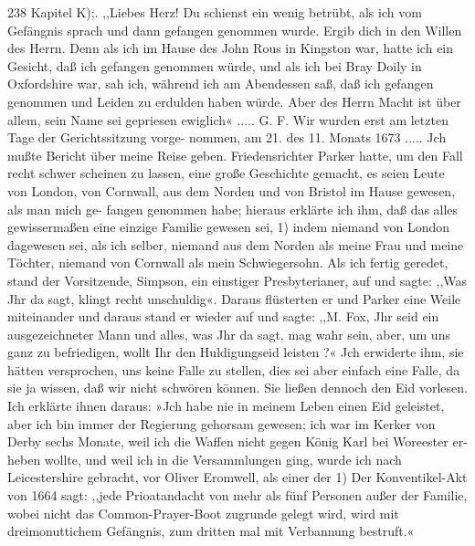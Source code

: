 238 Kapitel K);.
,,Liebes Herz!
Du schienst ein wenig betrübt, als ich vom Gefängnis sprach
und dann gefangen genommen wurde. Ergib dich in den Willen
des Herrn. Denn als ich im Hause des John Rous in Kingston
war, hatte ich ein Gesicht, daß ich gefangen genommen würde,
und als ich bei Bray Doily in Oxfordshire war, sah ich, während
ich am Abendessen saß, daß ich gefangen genommen und Leiden
zu erdulden haben würde. Aber des Herrn Macht ist über allem, sein
Name sei gepriesen ewiglich« ..... G. F.
Wir wurden erst am letzten Tage der Gerichtssitzung vorge-
nommen, am 21. des 11. Monats 1673 ..... Jch mußte
Bericht über meine Reise geben. Friedensrichter Parker hatte,
um den Fall recht schwer scheinen zu lassen, eine große Geschichte
gemacht, es seien Leute von London, von Cornwall, aus dem
Norden und von Bristol im Hause gewesen, als man mich ge-
fangen genommen habe; hieraus erklärte ich ihm, daß das alles
gewissermaßen eine einzige Familie gewesen sei, 1) indem niemand von
London dagewesen sei, als ich selber, niemand aus dem Norden als
meine Frau und meine Töchter, niemand von Cornwall als mein
Schwiegersohn.
Als ich fertig geredet, stand der Vorsitzende, Simpson, ein
einstiger Presbyterianer, auf und sagte: ,,Was Jhr da sagt, klingt
recht unschuldig«. Daraus flüsterten er und Parker eine Weile
miteinander und daraus stand er wieder auf und sagte: ,,M. Fox,
Jhr seid ein ausgezeichneter Mann und alles, was Jhr da sagt,
mag wahr sein, aber, um uns ganz zu befriedigen, wollt Ihr den
Huldigungseid leisten ?« Jch erwiderte ihm, sie hätten versprochen,
uns keine Falle zu stellen, dies sei aber einfach eine Falle, da sie
ja wissen, daß wir nicht schwören können. Sie ließen dennoch
den Eid vorlesen. Ich erklärte ihnen daraus: »Jch habe nie in
meinem Leben einen Eid geleistet, aber ich bin immer der Regierung
gehorsam gewesen; ich war im Kerker von Derby sechs Monate,
weil ich die Waffen nicht gegen König Karl bei Woreester er-
heben wollte, und weil ich in die Versammlungen ging, wurde
ich nach Leicestershire gebracht, vor Oliver Eromwell, als einer der
1) Der Konventikel-Akt von 1664 sagt: ,,jede Prioatandacht von mehr
als fünf Personen außer der Familie, wobei nicht das Common-Prayer-Boot
zugrunde gelegt wird, wird mit dreimonuttichem Gefängnis, zum dritten mal
mit Verbannung bestruft.«


